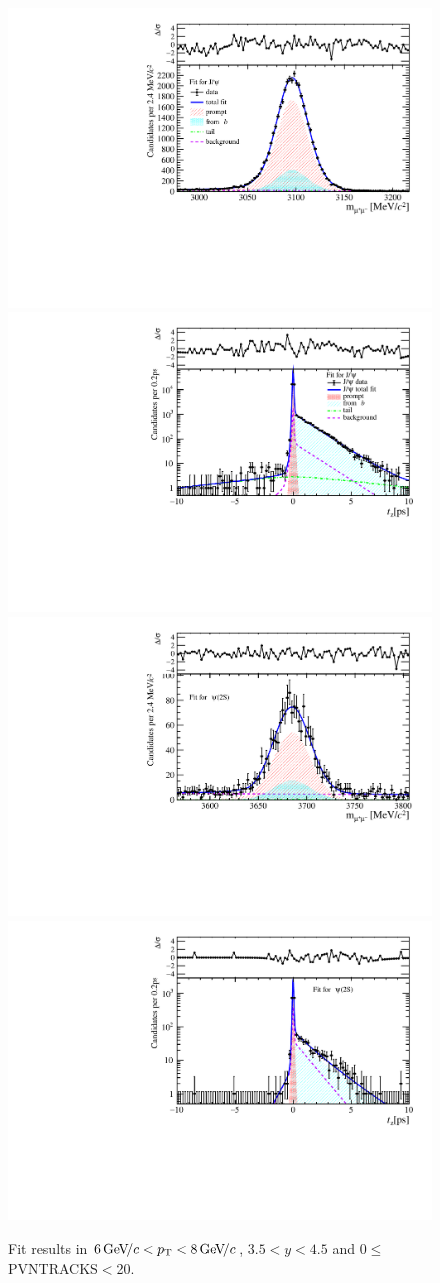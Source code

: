 \begin{figure}[H]
\begin{center}
\includegraphics[width=0.47\linewidth]{pdf/Jpsi/drawmass/n1y3pt4.pdf}
\includegraphics[width=0.47\linewidth]{pdf/Jpsi/2DFit/n1y3pt4.pdf}
\vspace*{-0.5cm}
\includegraphics[width=0.47\linewidth]{pdf/Psi2S/drawmass/n1y3pt4.pdf}
\includegraphics[width=0.47\linewidth]{pdf/Psi2S/2DFit/n1y3pt4.pdf}
\vspace*{-0.5cm}
\end{center}
\caption{Fit results in $6\text{\,Ge\kern -0.1em V\!/}c<p_{\mathrm{T}}<8\text{\,Ge\kern -0.1em V\!/}c$, $3.5<y<4.5$ and 0$\leq$PVNTRACKS$<$20.}
\label{Fitn1y3pt4}
\end{figure}
